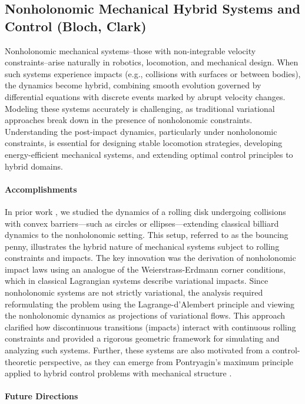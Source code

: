 \documentclass[letterpaper,11pt]{article}
\begin{document}
\subsection{Nonholonomic Mechanical Hybrid Systems and Control (Bloch, Clark)}\label{sec:nonholomomic}

Nonholonomic mechanical systems--those with non-integrable velocity constraints--arise naturally in robotics, locomotion, and mechanical design. 
When such systems experience impacts (e.g., collisions with surfaces or between bodies), the dynamics become hybrid, combining smooth evolution governed by differential equations with discrete events marked by abrupt velocity changes. 
Modeling these systems accurately is challenging, as traditional variational approaches break down in the presence of nonholonomic constraints. 
Understanding the post-impact dynamics, particularly under nonholonomic constraints, is essential for designing stable locomotion strategies, developing energy-efficient mechanical systems, and extending optimal control principles to hybrid domains. 

\paragraph{Accomplishments}

In prior work \cite{clark2019bouncing}, we studied the dynamics of a rolling disk undergoing collisions with convex barriers—such as circles or ellipses—extending classical billiard dynamics to the nonholonomic setting. 
This setup, referred to as the bouncing penny, illustrates the hybrid nature of mechanical systems subject to rolling constraints and impacts. 
The key innovation was the derivation of nonholonomic impact laws using an analogue of the Weierstrass-Erdmann corner conditions, which in classical Lagrangian systems describe variational impacts. 
Since nonholonomic systems are not strictly variational, the analysis required reformulating the problem using the Lagrange-d’Alembert principle and viewing the nonholonomic dynamics as projections of variational flows. 
This approach clarified how discontinuous transitions (impacts) interact with continuous rolling constraints and provided a rigorous geometric framework for simulating and analyzing such systems.
Further, these systems are also motivated from a control-theoretic perspective, as they can emerge from Pontryagin’s maximum principle applied to hybrid control problems with mechanical structure \cite{clark_oc}.

\paragraph{Future Directions}
\end{document}

